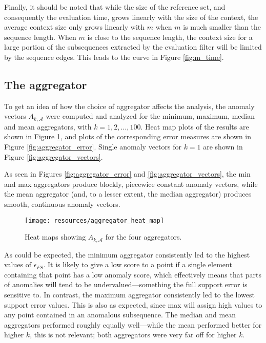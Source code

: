 Finally, it should be noted that while the size of the reference set, and consequently the evaluation time, grows linearly with the size of the context, the average context size only grows linearly with $m$ when $m$ is much smaller than the sequence length. When $m$ is close to the sequence length, the context size for a large portion of the subsequences extracted by the evaluation filter will be limited by the sequence edges. This leads to the curve in Figure \ref{fig:m_time}.

\clearpage

\subsection{The aggregator}
\FloatBarrier
\label{sect:A}

To get an idea of how the choice of aggregator affects the analysis, the anomaly vectors $A_{k, \mathcal{A}}$ were computed and analyzed for the minimum, maximum, median and mean aggregators, with $k = 1,2,\dots,100$. Heat map plots of the results are shown in Figure \ref{fig:aggregator_heat_map}, and plots of the corresponding error measures are shown in Figure \ref{fig:aggregator_error}. Single anomaly vectors for $k=1$ are shown in Figure \ref{fig:aggregator_vectors}.

As seen in Figures \ref{fig:aggregator_error} and \ref{fig:aggregator_vectors}, the min and max aggregators produce blockly, piecewice constant anomaly vectors, while the mean aggregator (and, to a lesser extent, the median aggregator) produces smooth, continuous anomaly vectors.

\begin{figure}[!ht]
    \vspace{-20pt}
    \begin{center}
        \texttt{[image: resources/aggregator\_heat\_map]}
    \end{center}
    \vspace{-10pt}
    \caption{\small{Heat maps showing $A_{k, \mathcal{A}}$ for the four aggregators.}}
    \label{fig:aggregator_heat_map}
    \vspace{-15pt}
\end{figure}

As could be expected, the minimum aggregator consistently led to the highest values of $\epsilon_{FS}$. It is likely to give a low score to a point if a single element containing that point has a low anomaly score, which effectively means that parts of anomalies will tend to be undervalued---something the full support error is sensitive to. In contrast, the maximum aggregator consistently led to the lowest support error values. This is also as expected, since max will assign high values to any point contained in an anomalous subsequence. The median and mean aggregators performed roughly equally well---while the mean performed better for higher $k$, this is not relevant; both aggregators were very far off for higher $k$.

